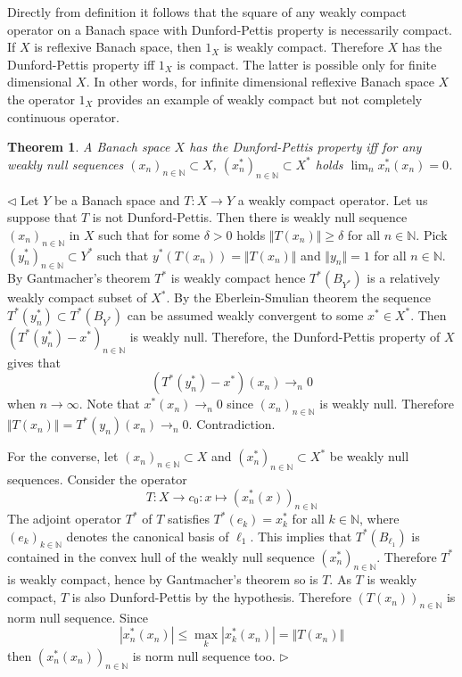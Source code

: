 \documentclass[12pt]{article}
\newtheorem{theorem}{Theorem}[section]
\newenvironment{proof}{\par $\triangleleft$}{$\triangleright$}
\begin{document}
Directly from definition it follows that the square of any weakly compact
operator on a Banach space with Dunford-Pettis property is necessarily compact.
If $X$ is reflexive Banach space, then $1_X$ is weakly compact. Therefore $X$
has the  Dunford-Pettis property iff $1_X$ is compact. The latter is possible
only for finite dimensional $X$. In other words, for infinite dimensional
reflexive Banach space $X$ the operator $1_X$ provides an example of weakly
compact but not completely continuous operator.

\begin{theorem} A Banach space $X$ has the Dunford-Pettis property iff for any
    weakly null sequences ${(x_n)}_{n\in\mathbb{N}}\subset X$,
    ${(x_n^*)}_{n\in\mathbb{N}}\subset X^*$ holds $\lim_n x_n^*(x_n)=0$.
\end{theorem}
\begin{proof} Let $Y$ be a Banach space and $T:X\to Y$ a weakly compact
    operator. Let us suppose that $T$ is not Dunford-Pettis. Then there is
    weakly null sequence ${(x_n)}_{n\in\mathbb{N}}$ in $X$ such that for some
    $\delta>0$ holds $\Vert T(x_n)\Vert\geq \delta$ for all $n\in\mathbb{N}$.
    Pick ${(y_n^*)}_{n\in\mathbb{N}}\subset Y^*$ such that $y^*(T(x_n))=\Vert
        T(x_n)\Vert$ and $\Vert y_n\Vert=1$ for all $n\in\mathbb{N}$. By
    Gantmacher’s theorem $T^*$ is weakly compact hence $T^*(B_{Y^*})$ is a
    relatively weakly compact subset of $X^*$. By the Eberlein-Smulian theorem
    the sequence $T^*(y_n^*)\subset T^*(B_{Y^*})$ can be assumed weakly
    convergent to some $x^*\in X^*$. Then ${(T^*(y_n^*)-x^*)}_{n\in\mathbb{N}}$
    is weakly null. Therefore, the Dunford-Pettis property of $X$ gives that
    $$
        (T^*(y_n^*)-x^*)(x_n)\to_n 0
    $$
    when $n\to\infty$. Note that $x^*(x_n)\to_n 0$ since
    ${(x_n)}_{n\in\mathbb{N}}$ is weakly null. Therefore $\Vert
        T(x_n)\Vert=T^*(y_n)(x_n)\to_n 0$. Contradiction.

    For the converse, let ${(x_n)}_{n\in\mathbb{N}}\subset X$ and
    ${(x_n^*)}_{n\in\mathbb{N}}\subset X^*$ be weakly null sequences. Consider
    the operator
    $$
        T:X \to c_0: x\mapsto {(x_n^*(x))}_{n\in\mathbb{N}}
    $$
    The adjoint operator $T^*$ of $T$ satisfies $T^*(e_k)=x_k^*$ for all
    $k\in\mathbb{N}$, where ${(e_k)}_{k\in\mathbb{N}}$ denotes the canonical
    basis of $\ell_1$. This implies that $T^*(B_{\ell_1})$ is contained in the
    convex hull of the weakly null sequence ${(x_n^*)}_{n\in\mathbb{N}}$.
    Therefore $T^*$ is weakly compact, hence by Gantmacher’s theorem so is $T$.
    As $T$ is weakly compact, $T$ is also Dunford-Pettis by the hypothesis.
    Therefore ${(T(x_n))}_{n\in\mathbb{N}}$ is norm null sequence. Since
    $$
        |x_n^*(x_n)|\leq\max_k |x_k^*(x_n)|=\Vert T(x_n)\Vert
    $$
    then ${(x_n^*(x_n))}_{n\in\mathbb{N}}$ is norm null sequence too.
\end{proof}
\end{document}
